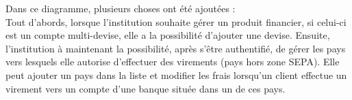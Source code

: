 Dans ce diagramme, plusieurs choses ont été ajoutées : \\
Tout d'abords, lorsque l'institution souhaite gérer un produit financier, si celui-ci est un compte multi-devise, elle a la possibilité d'ajouter une devise.
Ensuite, l'institution à maintenant la possibilité, après s'être authentifié, de gérer les pays vers lesquels elle autorise d'effectuer des virements (pays hors zone SEPA). 
Elle peut ajouter un pays dans la liste et modifier les frais lorsqu'un client effectue un virement vers un compte d'une banque située dans un de ces pays.
